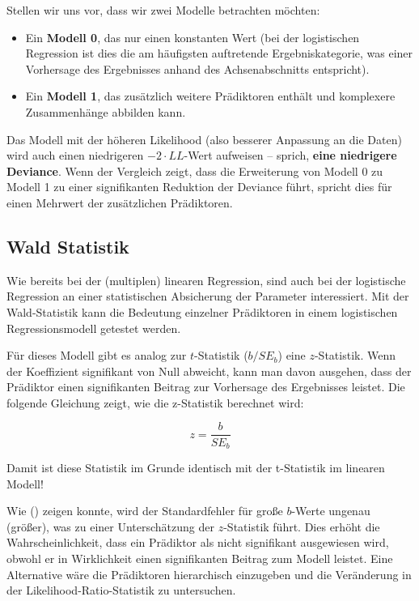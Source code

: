 \documentclass[
]{article}
\providecommand{\tightlist}{%
  \setlength{\itemsep}{0pt}\setlength{\parskip}{0pt}}
\begin{document}
Stellen wir uns vor, dass wir zwei Modelle betrachten möchten:

\begin{itemize}
\tightlist
\item
  Ein \textbf{Modell 0}, das nur einen konstanten Wert (bei der logistischen Regression ist dies die am häufigsten auftretende Ergebniskategorie, was einer Vorhersage des Ergebnisses anhand des Achsenabschnitts entspricht).
\item
  Ein \textbf{Modell 1}, das zusätzlich weitere Prädiktoren enthält und komplexere Zusammenhänge abbilden kann.
\end{itemize}

Das Modell mit der höheren Likelihood (also besserer Anpassung an die Daten) wird auch einen niedrigeren \(-2 \cdot LL\)-Wert aufweisen -- sprich, \textbf{eine niedrigere Deviance}. Wenn der Vergleich zeigt, dass die Erweiterung von Modell 0 zu Modell 1 zu einer signifikanten Reduktion der Deviance führt, spricht dies für einen Mehrwert der zusätzlichen Prädiktoren.

\subsection{Wald Statistik}\label{wald-statistik}

Wie bereits bei der (multiplen) linearen Regression, sind auch bei der logistische Regression an einer statistischen Absicherung der Parameter interessiert. Mit der Wald-Statistik kann die Bedeutung einzelner Prädiktoren in einem logistischen Regressionsmodell getestet werden.

Für dieses Modell gibt es analog zur \(t\)-Statistik (\(b / SE_{b}\)) eine \(z\)-Statistik. Wenn der Koeffizient signifikant von Null abweicht, kann man davon ausgehen, dass der Prädiktor einen signifikanten Beitrag zur Vorhersage des Ergebnisses leistet. Die folgende Gleichung zeigt, wie die z-Statistik berechnet wird:

\[z=\frac{b}{SE_b}\]

Damit ist diese Statistik im Grunde identisch mit der t-Statistik im linearen Modell!

Wie () zeigen konnte, wird der Standardfehler für große \(b\)-Werte ungenau (größer), was zu einer Unterschätzung der \(z\)-Statistik führt. Dies erhöht die Wahrscheinlichkeit, dass ein Prädiktor als nicht signifikant ausgewiesen wird, obwohl er in Wirklichkeit einen signifikanten Beitrag zum Modell leistet. Eine Alternative wäre die Prädiktoren hierarchisch einzugeben und die Veränderung in der Likelihood-Ratio-Statistik zu untersuchen.
\end{document}
